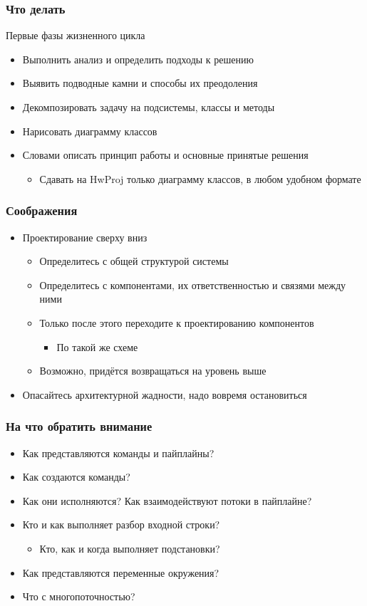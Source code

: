 \documentclass[xetex,mathserif,serif]{beamer}
\begin{document}
	\begin{frame}
		\frametitle{Что делать}
		Первые фазы жизненного цикла
		\begin{itemize}
			\item Выполнить анализ и определить подходы к решению
			\item Выявить подводные камни и способы их преодоления
			\item Декомпозировать задачу на подсистемы, классы и методы
			\item Нарисовать диаграмму классов
			\item Словами описать принцип работы и основные принятые решения
			\begin{itemize}
				\item Сдавать на HwProj только диаграмму классов, в любом удобном формате
			\end{itemize}
		\end{itemize}
	\end{frame}

	\begin{frame}
		\frametitle{Соображения}
		\begin{itemize}
			\item Проектирование сверху вниз
			\begin{itemize}
				\item Определитесь с общей структурой системы
				\item Определитесь с компонентами, их ответственностью и связями между ними
				\item Только после этого переходите к проектированию компонентов
				\begin{itemize}
					\item По такой же схеме
				\end{itemize}
				\item Возможно, придётся возвращаться на уровень выше
			\end{itemize}
			\item Опасайтесь архитектурной жадности, надо вовремя остановиться
		\end{itemize}
	\end{frame}

	\begin{frame}
		\frametitle{На что обратить внимание}
		\begin{itemize}
			\item Как представляются команды и пайплайны?
			\item Как создаются команды?
			\item Как они исполняются? Как взаимодействуют потоки в пайплайне?
			\item Кто и как выполняет разбор входной строки?
			\begin{itemize}
				\item Кто, как и когда выполняет подстановки?
			\end{itemize}
			\item Как представляются переменные окружения?
			\item Что с многопоточностью?
		\end{itemize}
	\end{frame}
\end{document}
